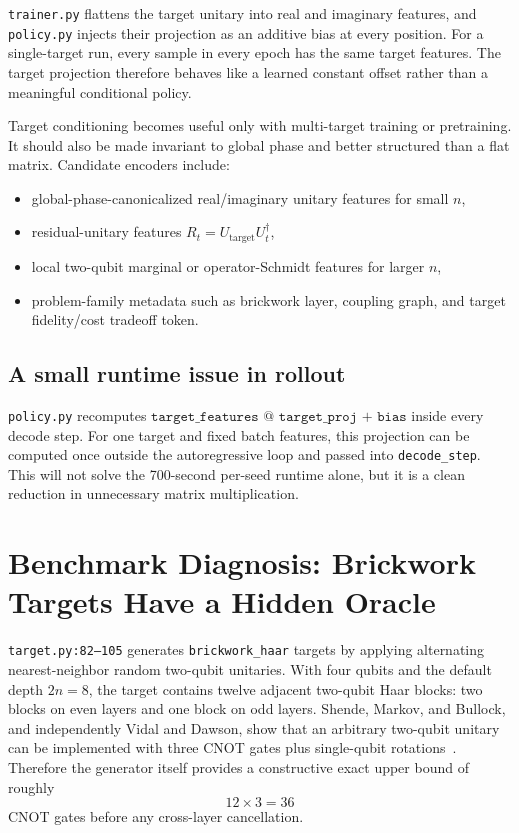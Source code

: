 \documentclass[11pt]{article}
\begin{document}
\texttt{trainer.py} flattens the target unitary into real and imaginary
features, and \texttt{policy.py} injects their projection as an additive
bias at every position.  For a single-target run, every sample in every epoch has
the same target features.  The target projection therefore behaves like a
learned constant offset rather than a meaningful conditional policy.

Target conditioning becomes useful only with multi-target training or
pretraining.  It should also be made invariant to global phase and better
structured than a flat matrix.  Candidate encoders include:
\begin{itemize}
  \item global-phase-canonicalized real/imaginary unitary features for small
  \(n\),
  \item residual-unitary features \(R_t = U_{\mathrm{target}} U_t^\dagger\),
  \item local two-qubit marginal or operator-Schmidt features for larger \(n\),
  \item problem-family metadata such as brickwork layer, coupling graph, and
  target fidelity/cost tradeoff token.
\end{itemize}

\subsection{A small runtime issue in rollout}

\texttt{policy.py} recomputes
\(\texttt{target\_features @ target\_proj + bias}\) inside every decode step.
For one target and fixed batch features, this projection can be computed once
outside the autoregressive loop and passed into \texttt{decode\_step}.  This will
not solve the 700-second per-seed runtime alone, but it is a clean reduction in
unnecessary matrix multiplication.

\section{Benchmark Diagnosis: Brickwork Targets Have a Hidden Oracle}
\label{sec:brickwork}

\texttt{target.py:82--105} generates \texttt{brickwork\_haar} targets by applying
alternating nearest-neighbor random two-qubit unitaries.  With four qubits and
the default depth \(2n=8\), the target contains twelve adjacent two-qubit Haar
blocks: two blocks on even layers and one block on odd layers.  Shende, Markov,
and Bullock, and independently Vidal and Dawson, show that an arbitrary
two-qubit unitary can be implemented with three CNOT gates plus single-qubit
rotations~\cite{shende2004minimal,vidal2004three}.  Therefore the generator
itself provides a constructive exact upper bound of roughly
\[
  12 \times 3 = 36
\]
CNOT gates before any cross-layer cancellation.
\end{document}
